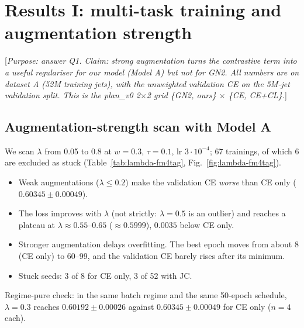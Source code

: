 \documentclass[11pt,a4paper]{article}
\newcommand{\note}[1]{\textcolor{blue!70!black}{[\emph{#1}]}}
\begin{document}
\section{Results I: multi-task training and augmentation strength}
\label{sec:res-multitask}

\note{Purpose: answer Q1. Claim: strong augmentation turns the contrastive term into a
useful regulariser for our model (Model A) but not for GN2. All numbers are on dataset A
(52M training jets), with the unweighted validation CE on the 5M-jet validation split.
This is the plan\_v0 2$\times$2 grid \{GN2, ours\} $\times$ \{CE, CE+CL\}.}

\subsection{Augmentation-strength scan with Model A}
We scan $\lambda$ from 0.05 to 0.8 at $w=0.3$, $\tau=0.1$, lr $3\cdot10^{-4}$; 67 trainings,
of which 6 are excluded as stuck (Table~\ref{tab:lambda-fm4tag}, Fig.~\ref{fig:lambda-fm4tag}).
\begin{itemize}
  \item Weak augmentations ($\lambda\le0.2$) make the validation CE \emph{worse} than CE
        only ($0.60345\pm0.00049$).
  \item The loss improves with $\lambda$ (not strictly: $\lambda=0.5$ is an outlier) and
        reaches a plateau at
        $\lambda\approx0.55$--$0.65$ ($\approx0.5999$), $0.0035$ below CE only.
  \item Stronger augmentation delays overfitting. The best epoch moves from about 8
        (CE only) to 60--99, and the validation CE barely rises after its minimum.
  \item Stuck seeds: 3 of 8 for CE only, 3 of 52 with JC.
\end{itemize}
Regime-pure check: in the same batch regime and the same 50-epoch schedule, $\lambda=0.3$
reaches $0.60192\pm0.00026$ against $0.60345\pm0.00049$ for CE only ($n=4$ each).
\end{document}
